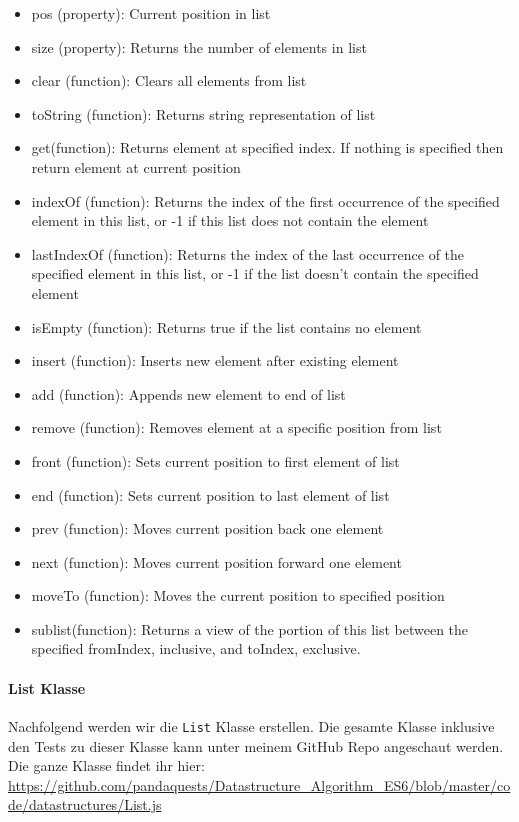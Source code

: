 \documentclass[babel]{book}
\begin{document}
\begin{itemize} 
	\item pos (property): Current position in list
	\item size (property): Returns the number of elements in list	
	\item clear (function): Clears all elements from list
	\item toString (function): Returns string representation of list
	\item get(function): Returns element at specified index. If nothing is specified then return element at current position
	\item indexOf (function): Returns the index of the first occurrence of the specified element in this list, or -1 if this list does not contain the element
	\item lastIndexOf (function): Returns the index of the last occurrence of the specified element in this list, or -1 if the list doesn't contain the specified element 
	\item isEmpty (function): Returns true if the list contains no element
	\item insert (function): Inserts new element after existing element
	\item add (function): Appends new element to end of list
	\item remove (function): Removes element at a specific position from list
	\item front (function): Sets current position to first element of list
	\item end (function): Sets current position to last element of list
	\item prev (function): Moves current position back one element
	\item next (function): Moves current position forward one element
	\item moveTo (function): Moves the current position to specified position	
	\item sublist(function): Returns a view of the portion of this list between the specified fromIndex, inclusive, and toIndex, exclusive. 
\end{itemize}

\paragraph{List Klasse}
Nachfolgend werden wir die \lstinline|List| Klasse erstellen. Die gesamte Klasse inklusive den Tests zu dieser Klasse kann unter meinem GitHub Repo angeschaut werden. Die ganze Klasse findet ihr hier: \url{https://github.com/pandaquests/Datastructure_Algorithm_ES6/blob/master/code/datastructures/List.js}
\end{document}
